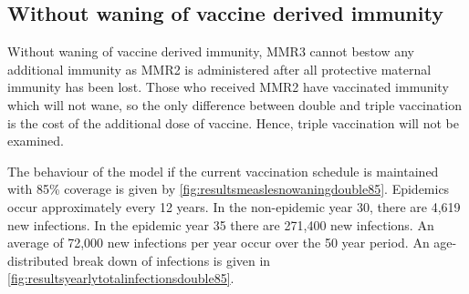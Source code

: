 \documentclass[a4paper,11pt] {scrartcl}
\begin{document}
\subsection{Without waning of vaccine derived immunity}
\label{subsec:resultsnowaning}
Without waning  of vaccine derived immunity, MMR3 cannot bestow any additional immunity as MMR2 is administered after all protective maternal immunity has been lost. Those who received MMR2 have vaccinated immunity which will not wane, so the only difference between double and triple vaccination is the cost of the additional dose of vaccine. Hence, triple vaccination will not be examined.

The behaviour of the model if the current vaccination schedule is maintained with 85\% coverage is given by \autoref{fig:resultsmeaslesnowaningdouble85}. Epidemics occur approximately every 12 years. In the non-epidemic year 30, there are 4,619 new infections. In the epidemic year 35 there are 271,400 new infections. An average of 72,000 new infections per year occur over the 50 year period. An age-distributed break down of infections is given in \autoref{fig:resultsyearlytotalinfectionsdouble85}. 
\end{document}

